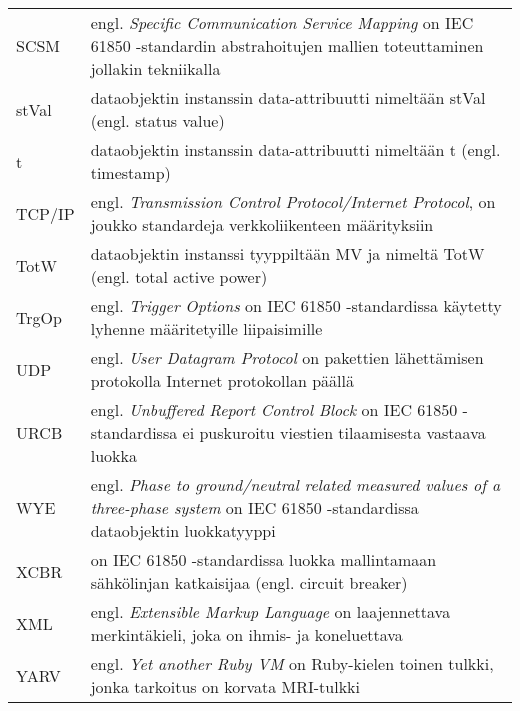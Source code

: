 \begin{tabularx}{\linewidth}[h]{@{} p{} p{} @{}}
	SCSM & engl. \emph{Specific Communication Service Mapping} on IEC 61850 -standardin abstrahoitujen mallien toteuttaminen jollakin tekniikalla \\
	stVal & dataobjektin instanssin data-attribuutti nimeltään stVal (engl. status value) \\
	t & dataobjektin instanssin data-attribuutti nimeltään t (engl. timestamp) \\
	TCP/IP & engl. \emph{Transmission Control Protocol/Internet Protocol}, on joukko standardeja verkkoliikenteen määrityksiin \\
	TotW & dataobjektin instanssi tyyppiltään MV ja nimeltä TotW (engl. total active power) \\
	TrgOp & engl. \emph{Trigger Options} on IEC 61850 -standardissa käytetty lyhenne määritetyille liipaisimille \\
	UDP & engl. \emph{User Datagram Protocol} on pakettien lähettämisen protokolla Internet protokollan päällä \\
	URCB & engl. \emph{Unbuffered Report Control Block} on IEC 61850 -standardissa ei puskuroitu viestien tilaamisesta vastaava luokka \\
	WYE & engl. \emph{Phase to ground/neutral related measured values of a three-phase system} on IEC 61850 -standardissa dataobjektin luokkatyyppi \\
	XCBR & on IEC 61850 -standardissa luokka mallintamaan sähkölinjan katkaisijaa (engl. circuit breaker) \\
	XML & engl. \emph{Extensible Markup Language} on laajennettava merkintäkieli, joka on ihmis- ja koneluettava \\
	YARV & engl. \emph{Yet another Ruby VM} on Ruby-kielen toinen tulkki, jonka tarkoitus on korvata MRI-tulkki \\
\end{tabularx}